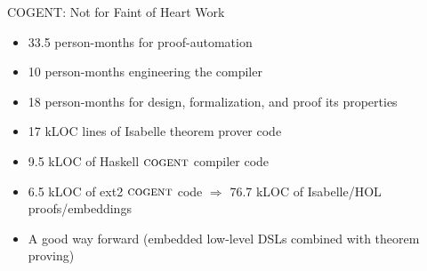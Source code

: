\documentclass[aspectratio=169]{beamer}
\begin{document}

\begin{frame}{COGENT: Not for Faint of Heart}
Work
    \begin{itemize}
        \item 33.5 person-months for proof-automation
        \item 10 person-months engineering the compiler
        \item 18 person-months for design, formalization, and proof its properties
        \item 17 kLOC lines of Isabelle theorem prover code
        \item 9.5 kLOC of Haskell $\textsc{cogent}$ compiler code
        \item 6.5 kLOC of ext2 $\textsc{cogent}$ code $\Rightarrow$ 76.7 kLOC of Isabelle/HOL proofs/embeddings
        \item A good way forward (embedded low-level DSLs combined with theorem proving)
    \end{itemize}
\end{frame}
\end{document}
